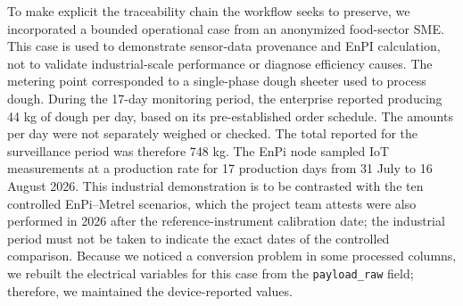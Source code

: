 \documentclass[technologies,article,submit,pdftex,moreauthors]{Definitions/mdpi}
\begin{document}
To make explicit the traceability chain the workflow seeks to preserve, we incorporated a bounded operational case from an anonymized food-sector SME. This case is used to demonstrate sensor-data provenance and EnPI calculation, not to validate industrial-scale performance or diagnose efficiency causes. The metering point corresponded to a single-phase dough sheeter used to process dough. During the 17-day monitoring period, the enterprise reported producing 44 kg of dough per day, based on its pre-established order schedule. The amounts per day were not separately weighed or checked. The total reported for the surveillance period was therefore 748 kg. The EnPi node sampled IoT measurements at a production rate for 17 production days from 31 July to 16 August 2026. This industrial demonstration is to be contrasted with the ten controlled EnPi--Metrel scenarios, which the project team attests were also performed in 2026 after the reference-instrument calibration date; the industrial period must not be taken to indicate the exact dates of the controlled comparison. Because we noticed a conversion problem in some processed columns, we rebuilt the electrical variables for this case from the \texttt{payload\_raw} field; therefore, we maintained the device-reported values. 
\end{document}
